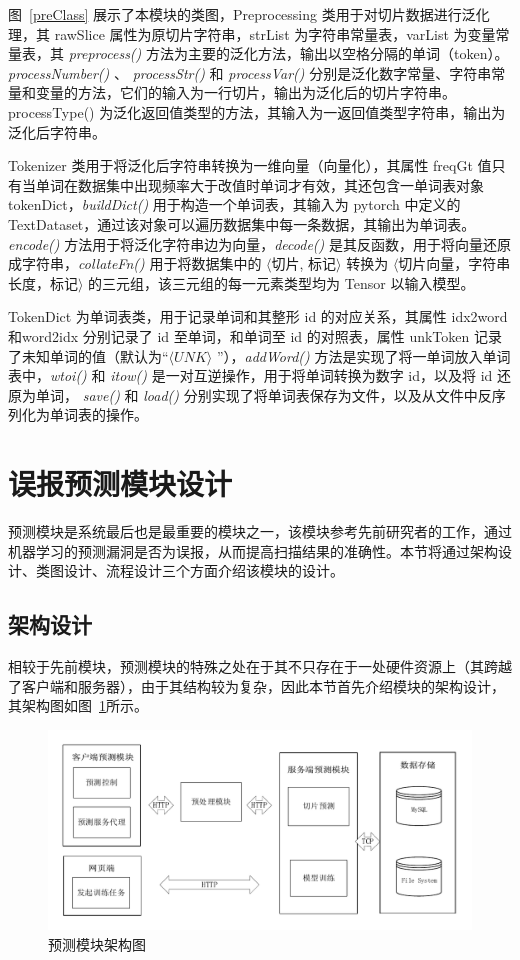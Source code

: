 图~\ref{preClass} 展示了本模块的类图，Preprocessing 类用于对切片数据进行泛化理，其 rawSlice 属性为原切片字符串，strList 为字符串常量表，varList 为变量常量表，其 \textit{preprocess()} 方法为主要的泛化方法，输出以空格分隔的单词（token）。\textit{processNumber()} 、 \textit{processStr()} 和 \textit{processVar()} 分别是泛化数字常量、字符串常量和变量的方法，它们的输入为一行切片，输出为泛化后的切片字符串。processType() 为泛化返回值类型的方法，其输入为一返回值类型字符串，输出为泛化后字符串。

Tokenizer 类用于将泛化后字符串转换为一维向量（向量化），其属性 freqGt 值只有当单词在数据集中出现频率大于改值时单词才有效，其还包含一单词表对象 tokenDict，\textit{buildDict()} 用于构造一个单词表，其输入为 pytorch 中定义的TextDataset，通过该对象可以遍历数据集中每一条数据，其输出为单词表。\textit{encode()} 方法用于将泛化字符串边为向量，\textit{decode()} 是其反函数，用于将向量还原成字符串，\textit{collateFn()} 用于将数据集中的 $\langle$切片, 标记$\rangle$ 转换为 $\langle$切片向量，字符串长度，标记$\rangle$ 的三元组，该三元组的每一元素类型均为 Tensor 以输入模型。

TokenDict 为单词表类，用于记录单词和其整形 id 的对应关系，其属性 idx2word 和word2idx 分别记录了 id 至单词，和单词至 id 的对照表，属性 unkToken 记录了未知单词的值（默认为“$\langle UNK \rangle$ ”），\textit{addWord()} 方法是实现了将一单词放入单词表中，\textit{wtoi()} 和 \textit{itow()} 是一对互逆操作，用于将单词转换为数字 id，以及将 id 还原为单词， \textit{save()} 和 \textit{load()} 分别实现了将单词表保存为文件，以及从文件中反序列化为单词表的操作。

\section{误报预测模块设计}

预测模块是系统最后也是最重要的模块之一，该模块参考先前研究者的工作，通过机器学习的预测漏洞是否为误报，从而提高扫描结果的准确性。本节将通过架构设计、类图设计、流程设计三个方面介绍该模块的设计。\\

\subsection{架构设计}

相较于先前模块，预测模块的特殊之处在于其不只存在于一处硬件资源上（其跨越了客户端和服务器），由于其结构较为复杂，因此本节首先介绍模块的架构设计，其架构图如图~\ref{predictArch}所示。

\begin{figure}[!htbp]
    \centering
    \includegraphics[width=0.8\linewidth]{FIGs/chapter3/predict-architecture.pdf}
    \caption{预测模块架构图}\label{predictArch}
\end{figure}

